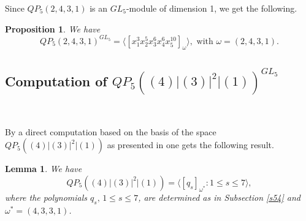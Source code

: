 \documentclass[reqno]{amsart}
\theoremstyle{plain}
\theoremstyle{definition}
\theoremstyle{plain}
\newtheorem{props}[thms]{Proposition}
\newtheorem{lems}[thms]{Lemma}
\theoremstyle{definition}
\numberwithin{equation}{section}
\begin{document}
Since $QP_5(2,4,3,1)$ is an $GL_5$-module of dimension 1, we get the following.  
\begin{props}\label{mdt32} We have 
$$QP_5(2,4,3,1)^{GL_5} = \langle [x_1^3x_2^5x_3^6x_4^6x_5^{10}]_{\omega}\rangle, \mbox{ with } \omega = (2,4,3,1).$$
\end{props}
\subsection{Computation of $QP_5((4)|(3)|^2|(1))^{GL_5}$}\

\medskip
By a direct computation based on the basis of the space $QP_5((4)|(3)|^2|(1))$ as presented in \cite{smo} one gets the following result. 

\begin{lems}\label{bdt3} We have
$$QP_5((4)|(3)|^2|(1)) = \langle [q_s]_{\omega^*} : 1 \leqslant s \leqslant 7\rangle, $$
where the polynomials $q_s,\, 1 \leqslant s \leqslant 7$, are determined as in Subsection \ref{s54} and $\omega^* = (4,3,3,1)$.
\end{lems}
\end{document}

